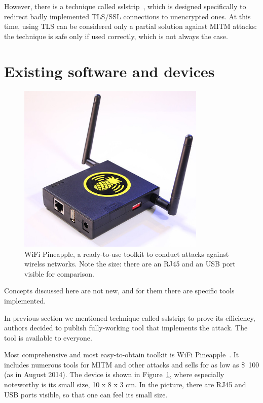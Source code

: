 \documentclass[12pt,a4paper,oneside,pdftex]{report}
\begin{document}
However, there is a technique called sslstrip~\cite{marlinspike2009new}, which is designed specifically to redirect badly implemented TLS/SSL connections to unencrypted ones. At this time, using TLS can be considered only a partial solution against MITM attacks: the technique is safe only if used correctly, which is not always the case.

\section{Existing software and devices}

\begin{figure}
    \center
    \includegraphics[width=0.8\textwidth]{images/wifi_pineapple_pic}
    \caption{WiFi Pineapple, a ready-to-use toolkit to conduct attacks against wirelss networks. Note the size: there are an RJ45 and an USB port visible for comparison.}
    \label{wifi_pineapple_pic}
\end{figure}

Concepts discussed here are not new, and for them there are specific tools implemented.

In previous section we mentioned technique called sslstrip; to prove its efficiency, authors decided to publish fully-working tool that implements the attack. The tool is available to everyone.~\cite{marlinspike2009new}

Most comprehensive and most easy-to-obtain toolkit is WiFi Pineapple~\cite{wifipineapple}. It includes numerous tools for MITM and other attacks and sells for as low as \$~100 (as in August 2014). The device is shown in Figure~\ref{wifi_pineapple_pic}, where especially noteworthy is its small size, 10 x 8 x 3 cm. In the picture, there are RJ45 and USB ports visible, so that one can feel its small size.
\end{document}
